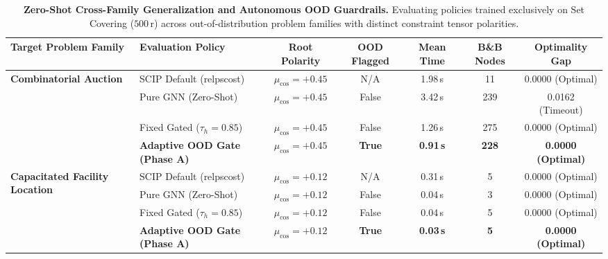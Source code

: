 \documentclass[10pt,twocolumn,letterpaper]{article}
\theoremstyle{plain}
\theoremstyle{definition}
\theoremstyle{remark}
\begin{document}
\begin{table}[t]
\centering
\caption{\textbf{Zero-Shot Cross-Family Generalization and Autonomous OOD Guardrails.} Evaluating policies trained exclusively on Set Covering ($500\,\text{r}$) across out-of-distribution problem families with distinct constraint tensor polarities.}
\label{tab:cross_family}
\small
\begin{tabular}{llccccc}
\toprule
\textbf{Target Problem Family} & \textbf{Evaluation Policy} & \textbf{Root Polarity} & \textbf{OOD Flagged} & \textbf{Mean Time} & \textbf{B\&B Nodes} & \textbf{Optimality Gap} \\
\midrule
\multirow{4}{*}{\textbf{Combinatorial Auction}}
 & SCIP Default (relpscost) & $\mu_{\text{cos}} = +0.45$ & N/A & 1.98\,s & 11 & 0.0000 (Optimal) \\
 & Pure GNN (Zero-Shot) & $\mu_{\text{cos}} = +0.45$ & False & 3.42\,s & 239 & 0.0162 (Timeout) \\
 & Fixed Gated ($\tau_h{=}0.85$) & $\mu_{\text{cos}} = +0.45$ & False & 1.26\,s & 275 & 0.0000 (Optimal) \\
 & \textbf{Adaptive OOD Gate (Phase A)} & $\mu_{\text{cos}} = +0.45$ & \textbf{True} & \textbf{0.91\,s} & \textbf{228} & \textbf{0.0000 (Optimal)} \\
\midrule
\multirow{4}{*}{\textbf{Capacitated Facility Location}}
 & SCIP Default (relpscost) & $\mu_{\text{cos}} = +0.12$ & N/A & 0.31\,s & 5 & 0.0000 (Optimal) \\
 & Pure GNN (Zero-Shot) & $\mu_{\text{cos}} = +0.12$ & False & 0.04\,s & 3 & 0.0000 (Optimal) \\
 & Fixed Gated ($\tau_h{=}0.85$) & $\mu_{\text{cos}} = +0.12$ & False & 0.04\,s & 5 & 0.0000 (Optimal) \\
 & \textbf{Adaptive OOD Gate (Phase A)} & $\mu_{\text{cos}} = +0.12$ & \textbf{True} & \textbf{0.03\,s} & \textbf{5} & \textbf{0.0000 (Optimal)} \\
\bottomrule
\end{tabular}
\end{table}
\end{document}
